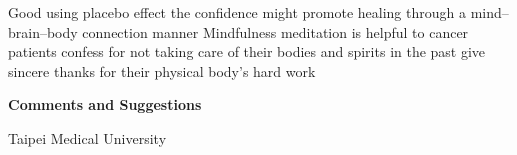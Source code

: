 \documentclass[
paper=landscape,
paper=160mm:90mm, %
fontsize=11pt, %
pagesize, %
parskip=half-, %
]{scrartcl} %
\theoremstyle{mythmstyle} %
\newcommand*{\myauthor}{Li-Hsing (Tex) Chi} %
\newcommand*{\mydate}{2021/09/10} %
\newcommand*{\myuni}{Taipei Medical University} %
\begin{document}
%
\clearpage

\thispagestyle{headings}

\begin{outline}

\1 Good using placebo effect
    \2 the confidence might promote healing through a mind--brain--body connection manner
\1 Mindfulness meditation is helpful to cancer patients
    \2 confess for not taking care of their bodies and spirits in the past
    \2 give sincere thanks for their physical body's hard work
\end{outline}

\clearpage
\thispagestyle{headings} %




\clearpage


\thispagestyle{empty} %

\begin{flushright}
  \vspace{1.6cm}
  \color{white}\sffamily
  {\bfseries\Large Comments and Suggestions\par}%
  \vspace{0.5cm}
  \normalsize
  \myuni\par
  \vfill
\end{flushright}

%
\end{document}
